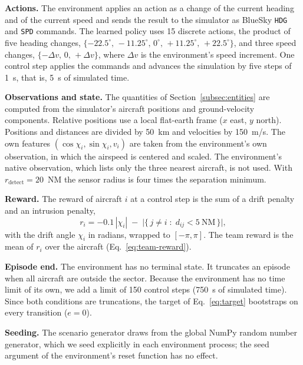 \textbf{Actions.} The environment applies an action as a change of the current heading and
of the current speed and sends the result to the simulator as BlueSky \texttt{HDG} and
\texttt{SPD} commands. The learned policy uses 15 discrete actions, the product of five
heading changes, $\{-22.5^\circ,\,-11.25^\circ,\,0^\circ,\,+11.25^\circ,\,+22.5^\circ\}$, and
three speed changes, $\{-\Delta v,\,0,\,+\Delta v\}$, where $\Delta v$ is the environment's
speed increment. One control step applies the commands and advances the simulation by five
steps of 1~s, that is, 5~s of simulated time.

\textbf{Observations and state.} The quantities of Section~\ref{subsec:entities} are computed
from the simulator's aircraft positions and ground-velocity components. Relative positions
use a local flat-earth frame ($x$ east, $y$ north). Positions and distances are divided by
50~km and velocities by 150~m/s. The own features $(\cos\chi_i,\sin\chi_i,v_i)$ are taken
from the environment's own observation, in which the airspeed is centered and scaled. The
environment's native observation, which lists only the three nearest aircraft, is not used.
With $r_{\text{detect}}=20$~NM the sensor radius is four times the separation minimum.

\textbf{Reward.} The reward of aircraft $i$ at a control step is the sum of a drift penalty
and an intrusion penalty,
\begin{equation}
\label{eq:env-reward}
r_i = -0.1\,|\chi_i| \;-\; \big|\{\, j\neq i \;:\; d_{ij} < 5\ \text{NM} \,\}\big| ,
\end{equation}
with the drift angle $\chi_i$ in radians, wrapped to $[-\pi,\pi]$. The team reward is the
mean of $r_i$ over the aircraft (Eq.~\eqref{eq:team-reward}).

\textbf{Episode end.} The environment has no terminal state. It truncates an episode when
all aircraft are outside the sector. Because the environment has no time limit of its own,
we add a limit of 150 control steps (750~s of simulated time). Since both conditions are
truncations, the target of Eq.~\eqref{eq:target} bootstraps on every transition ($e=0$).

\textbf{Seeding.} The scenario generator draws from the global NumPy random number
generator, which we seed explicitly in each environment process; the seed argument of the
environment's reset function has no effect.
